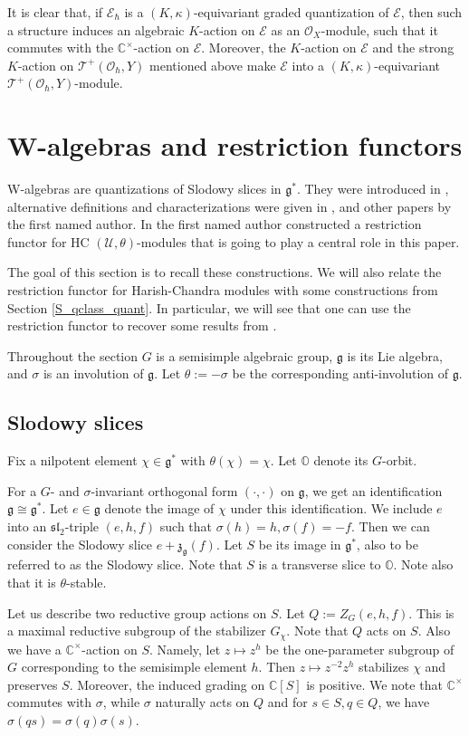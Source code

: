 \documentclass[12pt]{amsart}
\newcommand{\C}{\mathbb{C}}
\newcommand{\U}{\mathcal{U}}
\newcommand{\g}{\mathfrak{g}}
\newcommand{\Orb}{\mathbb{O}}
\newcommand{\TT}{\mathscr{T}}
\newcommand{\tatp}{\TT^+(\Q, Y)}
\newcommand{\cm}{\C^\times}
\newcommand{\OO}{\mathcal{O}}
\newcommand{\Q}{\OO_\hbar}
\newcommand{\EE}{\mathcal{E}}
\newcommand{\slf}{\mathfrak{sl}}
\theoremstyle{definition}
\numberwithin{equation}{section}
\begin{document}
It is clear that, if $\EE_\hbar$ is a $(K,\kappa)$-equivariant graded quantization of $\EE$, then such a structure induces an algebraic $K$-action on $\EE$ as an $\OO_X$-module, such that it commutes with the $\cm$-action on $\EE$. Moreover, the $K$-action on $\EE$ and the strong $K$-action on $\tatp$ mentioned above make $\EE$ into a $(K, \kappa)$-equivariant $\tatp$-module.



\section{W-algebras and restriction functors}
W-algebras are quantizations of Slodowy slices in $\g^*$. They were introduced
in \cite{Premet_slice}, alternative definitions and characterizations were given
in \cite{Wquant},\cite{HC} and other papers by the first named author.
In \cite[Section 6.1]{Wdim} the first named author constructed a restriction functor
for HC $(\U,\theta)$-modules that is going to play a central role in this paper.

The goal of this section is to recall these constructions. We will also relate the
restriction functor for Harish-Chandra modules with some constructions from
Section \ref{S_qclass_quant}. In particular, we will see that one can use the restriction
functor to recover some results from \cite{LY}.

Throughout the section $G$ is a semisimple algebraic group, $\g$ is its Lie algebra, and
$\sigma$ is an involution of $\g$. Let $\theta:=-\sigma$ be the corresponding anti-involution
of $\g$.

\subsection{Slodowy slices}\label{SS_Sl_sl}
Fix a nilpotent element $\chi\in \g^*$ with $\theta(\chi)=\chi$.
Let $\Orb$ denote its $G$-orbit.

For a $G$- and $\sigma$-invariant orthogonal form
$(\cdot,\cdot)$ on $\g$, we get an identification  $\g\cong \g^*$.
Let $e\in \g$ denote the image of $\chi$ under this identification.
We include $e$ into an $\slf_2$-triple $(e,h,f)$ such that
$\sigma(h)=h, \sigma(f)=-f$. Then we can consider the
Slodowy slice $e+\mathfrak{z}_{\g}(f)$. Let $S$ be its image in
$\g^*$, also to be referred to as the Slodowy slice. Note that
$S$ is a transverse slice to $\Orb$. Note also that it is $\theta$-stable.

Let us describe two reductive group actions on $S$.
Let $Q:=Z_G(e,h,f)$.
This is a maximal reductive subgroup of the stabilizer $G_\chi$. Note that
$Q$ acts on $S$. Also we have a $\C^\times$-action on $S$. Namely, let
$z\mapsto z^h$ be the one-parameter subgroup of $G$ corresponding to
the semisimple element $h$. Then $z \mapsto z^{-2} z^h$ stabilizes $\chi$
and preserves $S$. Moreover, the induced grading on $\C[S]$ is positive.
We note that $\C^\times$ commutes with $\sigma$, while $\sigma$ naturally
acts on $Q$ and for $s\in S, q\in Q$, we have $\sigma(qs)=\sigma(q)\sigma(s)$.
\end{document}
